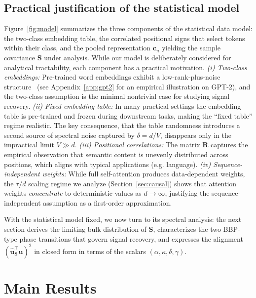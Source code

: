\documentclass{article}
\def\vc{{\bm{c}}}
\def\vu{{\bm{u}}}
\def\mR{{\bm{R}}}
\def\mS{{\bm{S}}}
\begin{document}
\subsection{Practical justification of the statistical model}\label{sec:justification}
Figure~\ref{fig:model} summarizes the three components of the statistical data model: the two-class embedding table, the correlated positional signs that select tokens within their class, and the pooled representation $\vc_n$ yielding the sample covariance $\mS$ under analysis. While our model is deliberately considered for analytical tractability, each component has a practical motivation. \textit{(i) Two-class embeddings:} Pre-trained word embeddings exhibit a low-rank-plus-noise structure~\citep{arora2016latent} (see Appendix~\ref{app:gpt2} for an empirical illustration on GPT-2), and the two-class assumption is the minimal nontrivial case for studying signal recovery. \textit{(ii) Fixed embedding table:} In many practical settings the embedding table is pre-trained and frozen during downstream tasks, making the ``fixed table'' regime realistic. The key consequence, that the table randomness introduces a second source of spectral noise captured by $\delta = d/V$, disappears only in the impractical limit $V\gg d$. \textit{(iii) Positional correlations:} The matrix $\mR$ captures the empirical observation that semantic content is unevenly distributed across positions, which aligns with typical applications (e.g. language). \textit{(iv) Sequence-independent weights:} While full self-attention produces data-dependent weights, the $\tau/d$ scaling regime we analyze (Section~\ref{sec:causal}) shows that attention weights \emph{concentrate} to deterministic values as $d\to\infty$, justifying the sequence-independent assumption as a first-order approximation.

\vspace{0.25em}
With the statistical model fixed, we now turn to its spectral analysis: the next section derives the limiting bulk distribution of $\mS$, characterizes the two BBP-type phase transitions that govern signal recovery, and expresses the alignment $(\hat\vu_\mS^\top \vu)^2$ in closed form in terms of the scalars $(\alpha,\kappa,\delta,\gamma)$.


\section{Main Results}\label{sec:main}
\end{document}
